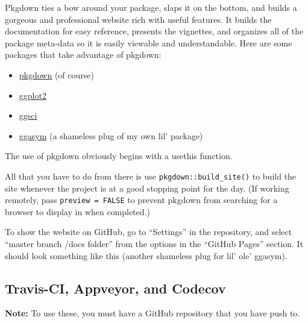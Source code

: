 \documentclass[]{book}
\newenvironment{Shaded}{\begin{snugshade}}{\end{snugshade}}
\newcommand{\CommentTok}[1]{\textcolor[rgb]{0.56,0.35,0.01}{\textit{#1}}}
\newcommand{\KeywordTok}[1]{\textcolor[rgb]{0.13,0.29,0.53}{\textbf{#1}}}
\newcommand{\NormalTok}[1]{#1}
\newcommand{\OperatorTok}[1]{\textcolor[rgb]{0.81,0.36,0.00}{\textbf{#1}}}
\providecommand{\tightlist}{%
  \setlength{\itemsep}{0pt}\setlength{\parskip}{0pt}}
\begin{document}
Pkgdown ties a bow around your package, slaps it on the bottom, and builds a gorgeous and professional website rich with useful features. It builds the documentation for easy reference, presents the vignettes, and organizes all of the package meta-data so it is easily viewable and understandable. Here are some packages that take advantage of pkgdown:

\begin{itemize}
\tightlist
\item
  \href{https://pkgdown.r-lib.org}{pkgdown} (of course)
\item
  \href{https://ggplot2.tidyverse.org}{ggplot2}
\item
  \href{https://nanx.me/ggsci/}{ggsci}
\item
  \href{https://jhrcook.github.io/ggasym/index.html}{ggasym} (a shameless plug of my own lil' package)
\end{itemize}

The use of pkgdown obviously begins with a usethis function.

\begin{Shaded}
\end{Shaded}

All that you have to do from there is use \texttt{pkgdown::build\_site()} to build the site whenever the project is at a good stopping point for the day. (If working remotely, pass \texttt{preview\ =\ FALSE} to prevent pkgdown from searching for a browser to display in when completed.)

To show the website on GitHub, go to ``Settings'' in the repository, and select ``master branch /docs folder'' from the options in the ``GitHub Pages'' section. It should look something like this (another shameless plug for lil' ole' ggasym).

\hypertarget{travis-ci-appveyor-and-codecov}{%
\subsection{Travis-CI, Appveyor, and Codecov}\label{travis-ci-appveyor-and-codecov}}

\textbf{Note:} To use these, you must have a GitHub repository that you have push to.
\end{document}

